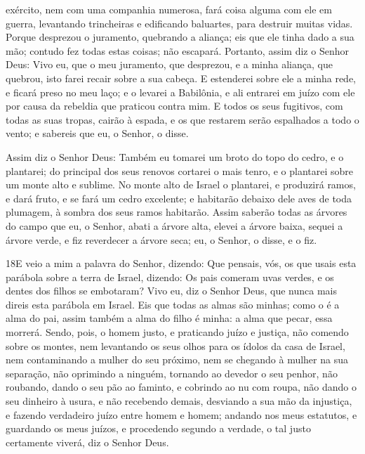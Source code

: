 exército, nem com uma companhia numerosa, fará coisa alguma com ele
em guerra, levantando trincheiras e edificando baluartes, para
destruir muitas vidas. Porque desprezou o juramento,
quebrando a aliança; eis que ele tinha dado a sua mão; contudo fez
todas estas coisas; não escapará. Portanto, assim diz o
Senhor Deus: Vivo eu, que o meu juramento, que desprezou, e a minha
aliança, que quebrou, isto farei recair sobre a sua cabeça. E
estenderei sobre ele a minha rede, e ficará preso no meu laço; e o
levarei a Babilônia, e ali entrarei em juízo com ele por causa da
rebeldia que praticou contra mim. E todos os seus fugitivos,
com todas as suas tropas, cairão à espada, e os que restarem serão
espalhados a todo o vento; e sabereis que eu, o Senhor, o disse.

Assim diz o Senhor Deus: Também eu tomarei um broto do topo do
cedro, e o plantarei; do principal dos seus renovos cortarei o mais
tenro, e o plantarei sobre um monte alto e sublime. No monte
alto de Israel o plantarei, e produzirá ramos, e dará fruto, e se
fará um cedro excelente; e habitarão debaixo dele aves de toda
plumagem, à sombra dos seus ramos habitarão. Assim saberão
todas as árvores do campo que eu, o Senhor, abati a árvore alta,
elevei a árvore baixa, sequei a árvore verde, e fiz reverdecer a
árvore seca; eu, o Senhor, o disse, e o fiz.

\medskip

\lettrine{18} E veio a mim a palavra do Senhor, dizendo:
Que pensais, vós, os que usais esta parábola sobre a terra de
Israel, dizendo: Os pais comeram uvas verdes, e os dentes dos filhos
se embotaram? Vivo eu, diz o Senhor Deus, que nunca mais direis
esta parábola em Israel. Eis que todas as almas são minhas; como
o é a alma do pai, assim também a alma do filho é minha: a alma que
pecar, essa morrerá. Sendo, pois, o homem justo, e praticando
juízo e justiça, não comendo sobre os montes, nem levantando os
seus olhos para os ídolos da casa de Israel, nem contaminando a
mulher do seu próximo, nem se chegando à mulher na sua separação,
não oprimindo a ninguém, tornando ao devedor o seu penhor, não
roubando, dando o seu pão ao faminto, e cobrindo ao nu com roupa,
não dando o seu dinheiro à usura, e não recebendo demais,
desviando a sua mão da injustiça, e fazendo verdadeiro juízo entre
homem e homem; andando nos meus estatutos, e guardando os meus
juízos, e procedendo segundo a verdade, o tal justo certamente
viverá, diz o Senhor Deus.

